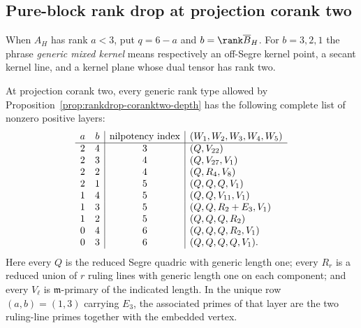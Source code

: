 \subsection{Pure-block rank drop at projection corank two}

When \(A_H\) has rank \(a<3\), put \(q=6-a\) and
\(b=\rank\overline B_H\).  For \(b=3,2,1\) the phrase
\emph{generic mixed kernel} means respectively an off-Segre kernel
point, a secant kernel line, and a kernel plane whose dual tensor has
rank two.

\begin{theorem}
\label{thm:rankdrop-primary-signatures}
At projection corank two, every generic rank type allowed by
Proposition~\ref{prop:rankdrop-coranktwo-depth} has the following
complete list of nonzero positive layers:
\[
\begin{array}{c c|c|l}
a&b&\text{nilpotency index}&(W_1,W_2,W_3,W_4,W_5)\\ \hline
2&4&3&(Q,V_{22})\\
2&3&4&(Q,V_{27},V_1)\\
2&2&4&(Q,R_4,V_8)\\
2&1&5&(Q,Q,Q,V_1)\\
1&4&5&(Q,Q,V_{11},V_1)\\
1&3&5&(Q,Q,R_2+E_3,V_1)\\
1&2&5&(Q,Q,Q,R_2)\\
0&4&6&(Q,Q,Q,R_2,V_1)\\
0&3&6&(Q,Q,Q,Q,V_1).
\end{array}
\]
Here every \(Q\) is the reduced Segre quadric with generic length
one; every \(R_r\) is a reduced union of \(r\) ruling lines with
generic length one on each component; and every \(V_\ell\) is
\(\mathfrak m\)-primary of the indicated length.  In the unique
row \((a,b)=(1,3)\) carrying \(E_3\), the associated primes of
that layer are the two ruling-line primes together with the embedded
vertex.
\end{theorem}

